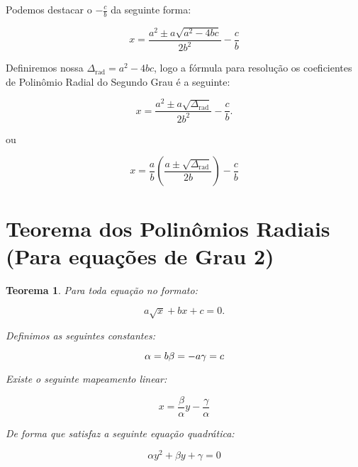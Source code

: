 \documentclass{article}
\newtheorem{theorem}{Teorema}
\begin{document}
Podemos destacar o $- \frac{c}{b}$ da seguinte forma:

\[
x = \frac{a^2 \pm a\sqrt{a^2-4bc}}{2b^2}- \frac{c}{b}
\]

Definiremos nossa $\Delta_{\text{rad}}= a^2-4bc$, logo a fórmula para resolução os coeficientes de Polinômio Radial do Segundo Grau é a seguinte:

\[
x = \frac{a^2 \pm a\sqrt{\Delta_{\text{rad}}}}{2b^2}- \frac{c}{b}.
\]

ou

\[
x = \frac{a}{b}\left(\frac{a \pm \sqrt{\Delta_{\text{rad}}}}{2b}\right)- \frac{c}{b}
\]

\section{Teorema dos Polinômios Radiais (Para equações de Grau 2)}

\begin{theorem}
Para toda equação no formato:

\[
a\sqrt{x} + bx + c = 0.
\]

Definimos as seguintes constantes:

\[
\alpha = b \\
\beta = -a \\
\gamma = c
\]

Existe o seguinte mapeamento linear:

\[
x=\frac{\beta}{\alpha}y-\frac{\gamma}{\alpha}
\]

De forma que satisfaz a seguinte equação quadrática:

\[
\alpha y^2 + \beta y + \gamma = 0 
\]
\end{theorem}
\end{document}
